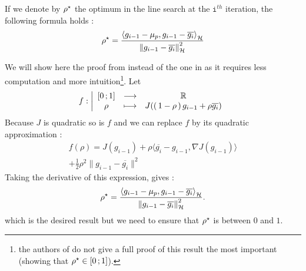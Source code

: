  \begin{boxtheorem}
If we denote by $\ropt$ the optimum in the line search at the $\texttt{i}^{th}$
iteration, the following formula holds :
\begin{equation}
\ropt = \frac { \left\langle g _ { i - 1 } - \mu _ { p } , g _ { i - 1 } - \overline{g_i} \right\rangle _ { \mathcal { H } } } { \left\| g _ { i - 1 } - \overline{g_i} \right\| _ { \mathcal { H } } ^ { 2 } }
\end{equation}
 \end{boxtheorem}
 \begin{boxcomputation}
  We will show here the proof from \cite{Beck} instead of the one in \cite{FWBQ}
  as it requires less computation and more intuition\footnote{the authors of \cite{FWBQ} do not give a full proof of this result the most important (showing that $\ropt \in \intff{0}{1}$).}. Let
  \begin{equation*}
    f : \left| \begin{array} { c c c } { \mathopen{[}0\mathpunct{};1\mathclose{]} } & { \longrightarrow } & { \mathbb { R } } \\ { \rho } & { \longmapsto } & { J(\left( \, 1-\rho \, \right)g_{i-1}+\rho{\overline{g_i}}) } \end{array} \right.
\end{equation*}
Because $J$ is quadratic so is $f$ and we can replace $f$ by its quadratic approximation :
\begin{equation*}
  \begin{split}
    f(\rho) = J ( g_{i-1} ) + \rho \langle \overline{g_i}- g_{i-1} , \nabla J ( g_{i-1} ) \rangle \\ + \frac { 1 } { 2 } \rho ^ { 2 } \|  g_{i-1} - \overline{g_i} \| ^ { 2 }
  \end{split}
\end{equation*}
Taking the derivative of this expression, gives :
\begin{equation*}
  \ropt =   \frac { \left\langle g _ { i - 1 } - \mu _ { p } , g _ { i - 1 } - \overline{g_i} \right\rangle _ { \mathcal { H } } } { \left\| g _ { i - 1 } - \overline{g_i} \right\| _ { \mathcal { H } } ^ { 2 } }.
\end{equation*}
which is the desired result but we need to ensure that $\ropt$ is between $0$ and
 $1$.


\end{boxcomputation}
